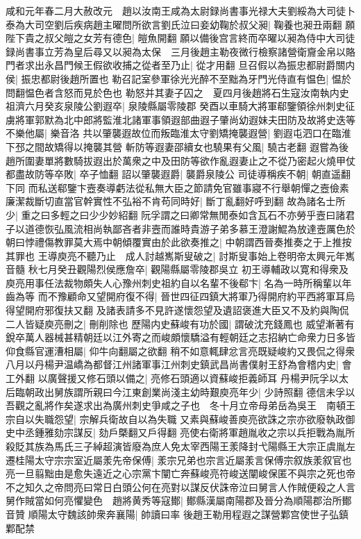 咸和元年春二月大赦改元　趙以汝南王咸為太尉録尚書事光禄大夫劉綏為大司徒卜泰為大司空劉后疾病趙主曜問所欲言劉氏泣曰妾幼鞠於叔父昶|{
	鞠養也昶丑兩翻}
願陛下貴之叔父皚之女芳有德色|{
	皚魚開翻}
願以備後宫言終而卒曜以昶為侍中大司徒録尚書事立芳為皇后尋又以昶為太保　三月後趙主勒夜微行檢察諸營衛齎金帛以賂門者求出永昌門候王假欲收捕之從者至乃止|{
	從才用翻}
旦召假以為振忠都尉爵關内侯|{
	振忠都尉後趙所置也}
勒召記室參軍徐光光醉不至黜為牙門光侍直有愠色|{
	愠於問翻愠色者含怒而見於色也}
勒怒并其妻子囚之　夏四月後趙將石生寇汝南執内史祖濟六月癸亥泉陵公劉遐卒|{
	泉陵縣屬零陵郡}
癸酉以車騎大將軍郗鑒領徐州刺史征虜將軍郭默為北中郎將監淮北諸軍事領遐部曲遐子肇尚幼遐妹夫田防及故將史迭等不樂他屬|{
	樂音洛}
共以肇襲遐故位而叛臨淮太守劉矯掩襲遐營|{
	劉遐屯泗口在臨淮下邳之間故矯得以掩襲其營}
斬防等遐妻邵續女也驍果有父風|{
	驍古老翻}
遐嘗為後趙所圍妻單將數騎拔遐出於萬衆之中及田防等欲作亂遐妻止之不從乃密起火燒甲仗都盡故防等卒敗|{
	卒子恤翻}
詔以肇襲遐爵|{
	襲爵泉陵公}
司徒導稱疾不朝|{
	朝直遥翻下同}
而私送郗鑒卞壼奏導虧法從私無大臣之節請免官雖事寢不行舉朝憚之壼儉素廉潔裁斷切直當官幹實性不弘裕不肯苟同時好|{
	斷丁亂翻好呼到翻}
故為諸名士所少|{
	重之曰多輕之曰少少妙紹翻}
阮孚謂之曰卿常無閒泰如含瓦石不亦勞乎壼曰諸君子以道德恢弘風流相尚執鄙吝者非壼而誰時貴游子弟多慕王澄謝鯤為放達壼厲色於朝曰悖禮傷教罪莫大焉中朝傾覆實由於此欲奏推之|{
	中朝謂西晉奏推奏之于上推按其罪也}
王導庾亮不聽乃止　成人討越嶲斯叟破之|{
	討斯叟事始上卷明帝太興元年嶲音髓}
秋七月癸丑觀陽烈侯應詹卒|{
	觀陽縣屬零陵郡吳立}
初王導輔政以寛和得衆及庾亮用事任法裁物頗失人心豫州刺史祖約自以名輩不後郗卞|{
	名為一時所稱輩以年齒為等}
而不豫顧命又望開府復不得|{
	晉世四征四鎮大將軍乃得開府約平西將軍耳烏得望開府邪復扶又翻}
及諸表請多不見許遂懷怨望及遺詔褒進大臣又不及約與陶侃二人皆疑庾亮刪之|{
	刪削除也}
歷陽内史蘇峻有功於國|{
	謂破沈充錢鳳也}
威望漸著有銳卒萬人器械甚精朝廷以江外寄之而峻頗懷驕溢有輕朝廷之志招納亡命衆力日多皆仰食縣官運漕相屬|{
	仰牛向翻屬之欲翻}
稍不如意輒肆忿言亮既疑峻約又畏侃之得衆八月以丹楊尹温嶠為都督江州諸軍事江州刺史鎮武昌尚書僕射王舒為會稽内史|{
	會工外翻}
以廣聲援又修石頭以備之|{
	亮修石頭適以資蘇峻拒義師耳}
丹楊尹阮孚以太后臨朝政出舅族謂所親曰今江東創業尚淺主幼時艱庾亮年少|{
	少詩照翻}
德信未孚以吾觀之亂將作矣遂求出為廣州刺史爭咸之子也　冬十月立帝母弟岳為吳王　南頓王宗自以失職怨望|{
	宗解兵衛故自以為失職}
又素與蘇峻善庾亮欲誅之宗亦欲廢執政御史中丞鍾雅劾宗謀反|{
	劾戶槩翻又戶得翻}
亮使右衛將軍趙胤收之宗以兵拒戰為胤所殺貶其族為馬氏三子綽超演皆廢為庶人免太宰西陽王羕降封弋陽縣王大宗正虞胤左遷桂陽太守宗宗室近屬羕先帝保傅|{
	羕宗兄弟也宗言近屬羕言保傅宗叙族羕叙官也}
亮一旦翦黜由是愈失遠近之心宗黨卞闡亡奔蘇峻亮符峻送闡峻保匿不與宗之死也帝不之知久之帝問亮曰常日白頭公何在亮對以謀反伏誅帝泣曰舅言人作賊便殺之人言舅作賊當如何亮懼變色　趙將黄秀等寇鄼|{
	鄼縣漢屬南陽郡及晉分為順陽郡治所鄼音贊}
順陽太守魏該帥衆奔襄陽|{
	帥讀曰率}
後趙王勒用程遐之謀營鄴宫使世子弘鎮鄴配禁

